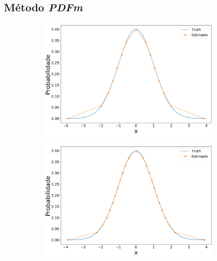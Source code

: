 \subsection{Método \textit{PDFm}}

\begin{figure}[H]
	\centering
	\begin{subfigure}[b]{0.45\textwidth}
		\centering 
		\includegraphics[width=\linewidth]{./figuras/PDFm_normal_15}
		\caption{}
		\label{fig:pdfnorm15}
	\end{subfigure}
	\hfill
	\begin{subfigure}[b]{0.45\textwidth}
		\centering 
		\includegraphics[width=\linewidth]{./figuras/PDFm_normal_25}
		\caption{}
		\label{fig:pdfnorm25}
	\end{subfigure}


\end{figure}
